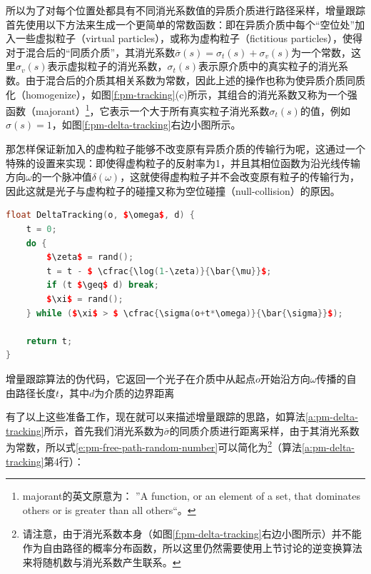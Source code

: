 所以为了对每个位置处都具有不同消光系数值的异质介质进行路径采样，增量跟踪首先使用以下方法来生成一个更简单的常数函数：即在异质介质中每个“空位处”加入一些虚拟粒子（virtual particles），或称为虚构粒子（fictitious particles），使得对于混合后的“同质介质”，其消光系数$\bar{\sigma}(s)=\sigma_t(s)+\sigma_v(s)$为一个常数，这里$\sigma_v(s)$表示虚拟粒子的消光系数，$\sigma_t(s)$表示原介质中的真实粒子的消光系数。由于混合后的介质其相关系数为常数，因此上述的操作也称为使异质介质同质化（homogenize），如图\ref{f:pm-tracking}(c)所示，其组合的消光系数又称为一个强函数（majorant）\footnote{majorant的英文原意为： ”A function, or an element of a set, that dominates others or is greater than all others“。}，它表示一个大于所有真实粒子消光系数$\sigma_t(s)$的值，例如$\sigma(s)=1$\cite{a:ProgressivePhotonBeams}，如图\ref{f:pm-delta-tracking}右边小图所示。

那怎样保证新加入的虚构粒子能够不改变原有异质介质的传输行为呢，这通过一个特殊的设置来实现：即使得虚构粒子的反射率为1，并且其相位函数为沿光线传输方向$\omega$的一个脉冲值$\delta(\omega)$，这就使得虚构粒子并不会改变原有粒子的传输行为，因此这就是光子与虚构粒子的碰撞又称为空位碰撞（null-collision）的原因。

\begin{algorithm}
\begin{lstlisting}[language=C++, mathescape]
float DeltaTracking(o, $\omega$, d) {
	t = 0;
	do {
		$\zeta$ = rand();
		t = t - $ \cfrac{\log(1-\zeta)}{\bar{\mu}}$;
		if (t $\geq$ d) break;
		$\xi$ = rand();
	} while ($\xi$ > $ \cfrac{\sigma(o+t*\omega)}{\bar{\sigma}}$);
	
	return t;
}
\end{lstlisting}
\caption{增量跟踪算法的伪代码，它返回一个光子在介质中从起点$o$开始沿方向$\omega$传播的自由路径长度$t$，其中$d$为介质的边界距离}
\label{a:pm-delta-tracking}
\end{algorithm}


有了以上这些准备工作，现在就可以来描述增量跟踪的思路，如算法\ref{a:pm-delta-tracking}所示，首先我们消光系数为$\bar{\sigma}$的同质介质进行距离采样，由于其消光系数为常数，所以式\ref{e:pm-free-path-random-number}可以简化为\footnote{请注意，由于消光系数本身（如图\ref{f:pm-delta-tracking}右边小图所示）并不能作为自由路径的概率分布函数，所以这里仍然需要使用上节讨论的逆变换算法来将随机数与消光系数产生联系。}（算法\ref{a:pm-delta-tracking}第4行）：

